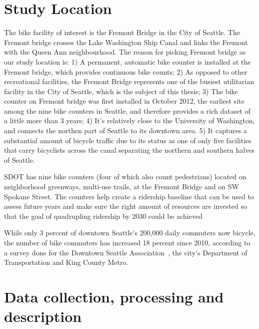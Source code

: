 \documentclass [11pt, proquest] {uwthesis}[2015/03/03]
\begin{document}
\section{Study Location}
The bike facility of interest is the Fremont Bridge in the City of Seattle. The Fremont bridge crosses the Lake Washington Ship Canal and links the Fremont with the Queen Ann neighbourhood. The reason for picking Fremont bridge as our study location is: 1) A permanent, automatic bike counter is installed at the Fremont bridge, which provides continuous bike counts; 2) As opposed to other recreational facilities, the Fremont Bridge represents one of the busiest utilitarian facility in the City of Seattle, which is the subject of this thesis; 3) The bike counter on Fremont bridge was first installed in October 2012, the earliest site among the nine bike counters in Seattle, and therefore provides a rich dataset of a little more than 3 years; 4) It's relatively close to the University of Washington, and connects the northen part of Seattle to its downtown area. 5) It captures a substantial amount of bicycle traffic due to its status as one of only five facilities that carry bicyclists across the canal separating the northern and southern halves of Seattle.

SDOT has nine bike counters (four of which also count pedestrians) located on neighborhood greenways, multi-use trails, at the Fremont  Bridge and on SW Spokane Street. The counters help create a ridership baseline that can be used to assess future years and make sure the right amount of resources are invested so that the goal of quadrupling ridership by 2030 could be achieved~\cite{SDOT_BMP15}

While only 3 percent of downtown Seattle’s 200,000 daily commuters now bicycle, the number of bike commuters has increased 18 percent since 2010, according to a survey done for the Downtown Seattle Association~\cite{}, the city’s Department of Transportation and King County Metro.

\section{Data collection, processing and description}
\end{document}
